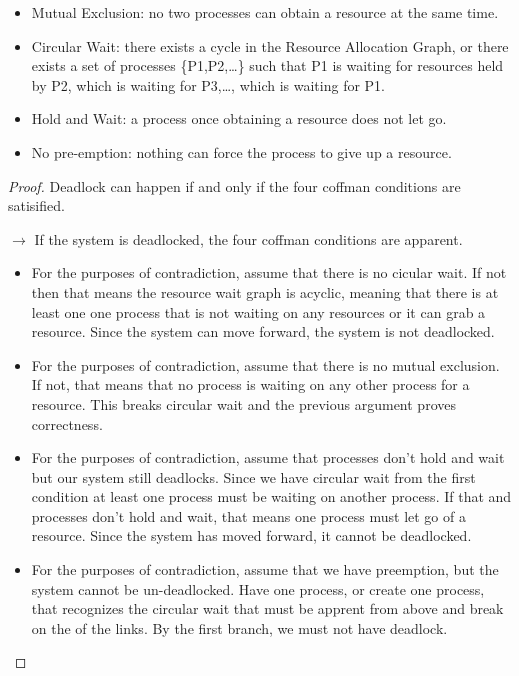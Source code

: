 \begin{itemize}
\tightlist
\item
  \gls{Mutual Exclusion}: no two processes can obtain a resource at the same time.
\item
  \gls{Circular Wait}: there exists a cycle in the Resource Allocation Graph, or there exists a set of processes \{P1,P2,\ldots{}\} such that P1 is waiting for resources held by P2, which is waiting for P3,\ldots{}, which is waiting for P1.
\item
  \gls{Hold and Wait}: a process once obtaining a resource does not let go.
\item
  No \gls{pre-emption}: nothing can force the process to give up a resource.
\end{itemize}

\begin{proof} Deadlock can happen if and only if the four coffman conditions are satisified.

$\rightarrow$ If the system is deadlocked, the four coffman conditions are apparent.

\begin{itemize}
\item For the purposes of contradiction, assume that there is no cicular wait. If not then that means the resource wait graph is acyclic, meaning that there is at least one one process that is not waiting on any resources or it can grab a resource. Since the system can move forward, the system is not deadlocked.
\item For the purposes of contradiction, assume that there is no mutual exclusion. If not, that means that no process is waiting on any other process for a resource. This breaks circular wait and the previous argument proves correctness.
\item For the purposes of contradiction, assume that processes don't hold and wait but our system still deadlocks. Since we have circular wait from the first condition at least one process must be waiting on another process. If that and processes don't hold and wait, that means one process must let go of a resource. Since the system has moved forward, it cannot be deadlocked.
\item For the purposes of contradiction, assume that we have preemption, but the system cannot be un-deadlocked. Have one process, or create one process, that recognizes the circular wait that must be apprent from above and break on the of the links. By the first branch, we must not have deadlock.
\end{itemize}


\end{proof}
